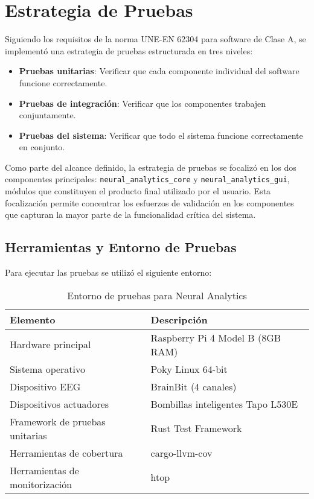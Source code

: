 \section{Estrategia de Pruebas}

Siguiendo los requisitos de la norma UNE-EN 62304 para software de Clase A, se implementó una estrategia de pruebas estructurada en tres niveles:

\begin{itemize}
    \item \textbf{Pruebas unitarias}: Verificar que cada componente individual del software funcione correctamente.
    \item \textbf{Pruebas de integración}: Verificar que los componentes trabajen conjuntamente.
    \item \textbf{Pruebas del sistema}: Verificar que todo el sistema funcione correctamente en conjunto.
\end{itemize}

Como parte del alcance definido, la estrategia de pruebas se focalizó en los dos componentes principales: \texttt{neural\_analytics\_core} y \texttt{neural\_analytics\_gui}, módulos que constituyen el producto final utilizado por el usuario. Esta focalización permite concentrar los esfuerzos de validación en los componentes que capturan la mayor parte de la funcionalidad crítica del sistema.

\subsection{Herramientas y Entorno de Pruebas}

Para ejecutar las pruebas se utilizó el siguiente entorno:

\begin{table}[ht]
    \centering
    \small
    \begin{tabular}{|p{4cm}|p{8cm}|}
        \hline
        \textbf{Elemento} & \textbf{Descripción} \\
        \hline
        Hardware principal & Raspberry Pi 4 Model B (8GB RAM) \\
        \hline
        Sistema operativo & Poky Linux 64-bit \\
        \hline
        Dispositivo EEG & BrainBit (4 canales) \\
        \hline
        Dispositivos actuadores & Bombillas inteligentes Tapo L530E \\
        \hline
        Framework de pruebas unitarias & Rust Test Framework \\
        \hline
        Herramientas de cobertura & cargo-llvm-cov \\
        \hline
        Herramientas de monitorización & htop \\
        \hline
    \end{tabular}
    \caption{Entorno de pruebas para Neural Analytics}
    \label{tab:test_environment}
\end{table}

